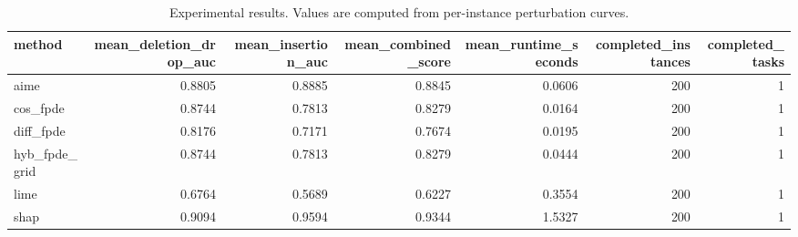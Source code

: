 \begin{table}[t]
\caption{Experimental results. Values are computed from per-instance perturbation curves.}
\label{tab:main_results_computed}
\centering
\begin{tabular}{lrrrrrr}
\toprule
method & mean\_deletion\_drop\_auc & mean\_insertion\_auc & mean\_combined\_score & mean\_runtime\_seconds & completed\_instances & completed\_tasks \\
\midrule
aime & 0.8805 & 0.8885 & 0.8845 & 0.0606 & 200 & 1 \\
cos\_fpde & 0.8744 & 0.7813 & 0.8279 & 0.0164 & 200 & 1 \\
diff\_fpde & 0.8176 & 0.7171 & 0.7674 & 0.0195 & 200 & 1 \\
hyb\_fpde\_grid & 0.8744 & 0.7813 & 0.8279 & 0.0444 & 200 & 1 \\
lime & 0.6764 & 0.5689 & 0.6227 & 0.3554 & 200 & 1 \\
shap & 0.9094 & 0.9594 & 0.9344 & 1.5327 & 200 & 1 \\
\bottomrule
\end{tabular}

\end{table}

